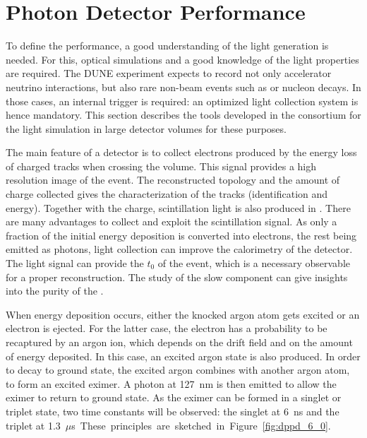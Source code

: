 \section{Photon Detector Performance}
\label{sec:fddp-pd-6}

To define the  performance, a good understanding of the light generation is needed. For this, optical simulations and a good knowledge of the light properties are required. The DUNE experiment expects to record not only accelerator neutrino interactions, but also rare non-beam events such as  or nucleon decays. In those cases, an internal trigger is required: an optimized light collection system is hence mandatory. This section describes the tools developed in the consortium for the light simulation in large detector volumes for these purposes.

The main feature of a \lartpc detector is to collect electrons produced by the energy loss of charged tracks when crossing the volume. This signal provides a high resolution \threed image of the event. The reconstructed topology and the amount of charge collected gives the characterization of the tracks (identification and energy). Together with the charge, scintillation light is also produced in \lar. There are many advantages to collect and exploit the scintillation signal. As only a fraction of the initial energy deposition is converted into electrons, the rest being emitted as photons, light collection can improve the calorimetry of the detector. The light signal can provide the $t_0$ of the event, which is a necessary observable for a proper reconstruction. The study of the slow component can give insights into the purity of the \lar. 

When energy deposition occurs, either the knocked argon atom gets excited or an electron is ejected. For the latter case, the electron has a probability to be recaptured by an argon ion, which depends on the drift field and on the amount of energy deposited. In this case, an excited argon state is also produced. In order to decay to ground state, the excited argon combines with another argon atom, to form an excited eximer. A photon at \SI{127}{nm} is then emitted to allow the eximer to return to ground state. As the eximer can be formed in a singlet or triplet state, two time constants will be observed: the singlet at \SI{6}{ns}
and the triplet at \SI{1.3}{$\mu$s}. These principles are sketched in Figure~\ref{fig:dppd_6_0}.

